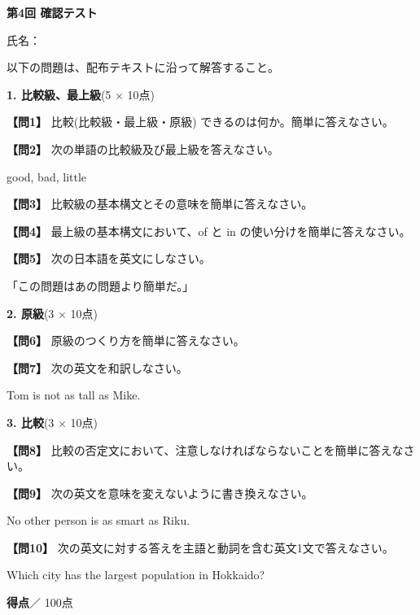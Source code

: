 
\begin{center}
{\Large\textbf{第4回 確認テスト}}
\end{center}
\vspace{0.15em}
\begin{flushright}
氏名：\testnameblank
\end{flushright}
\vspace{0.25em}
\noindent 以下の問題は、配布テキストに沿って解答すること。
\vspace{0.35em}

\noindent\textbf{1. 比較級、最上級}(5 $\times$ 10点)

\noindent\textbf{【問1】} 比較(比較級・最上級・原級) できるのは何か。簡単に答えなさい。
\testqsep

\noindent\textbf{【問2】} 次の単語の比較級及び最上級を答えなさい。

good, bad, little
\testqsep

\noindent\textbf{【問3】} 比較級の基本構文とその意味を簡単に答えなさい。
\testqsep

\noindent\textbf{【問4】} 最上級の基本構文において、of と in の使い分けを簡単に答えなさい。
\testqsep

\noindent\textbf{【問5】} 次の日本語を英文にしなさい。

「この問題はあの問題より簡単だ。」
\testqsep

\noindent\textbf{2. 原級}(3 $\times$ 10点)

\noindent\textbf{【問6】} 原級のつくり方を簡単に答えなさい。
\testqsep

\noindent\textbf{【問7】} 次の英文を和訳しなさい。

Tom is not as tall as Mike.
\testqsep

\noindent\textbf{3. 比較}(3 $\times$ 10点)

\noindent\textbf{【問8】} 比較の否定文において、注意しなければならないことを簡単に答えなさい。
\testqsep

\noindent\textbf{【問9】} 次の英文を意味を変えないように書き換えなさい。

No other person is as smart as Riku.
\testqsep

\noindent\textbf{【問10】} 次の英文に対する答えを主語と動詞を含む英文1文で答えなさい。

Which city has the largest population in Hokkaido?
\testqsep

\begin{flushright}
\textbf{得点}\testscoreblank ／ 100点
\end{flushright}
